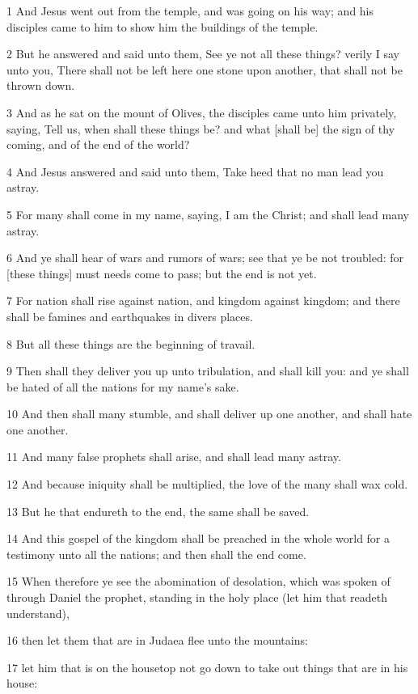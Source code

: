 \par 1 And Jesus went out from the temple, and was going on his way; and his disciples came to him to show him the buildings of the temple.
\par 2 But he answered and said unto them, See ye not all these things? verily I say unto you, There shall not be left here one stone upon another, that shall not be thrown down.
\par 3 And as he sat on the mount of Olives, the disciples came unto him privately, saying, Tell us, when shall these things be? and what [shall be] the sign of thy coming, and of the end of the world?
\par 4 And Jesus answered and said unto them, Take heed that no man lead you astray.
\par 5 For many shall come in my name, saying, I am the Christ; and shall lead many astray.
\par 6 And ye shall hear of wars and rumors of wars; see that ye be not troubled: for [these things] must needs come to pass; but the end is not yet.
\par 7 For nation shall rise against nation, and kingdom against kingdom; and there shall be famines and earthquakes in divers places.
\par 8 But all these things are the beginning of travail.
\par 9 Then shall they deliver you up unto tribulation, and shall kill you: and ye shall be hated of all the nations for my name's sake.
\par 10 And then shall many stumble, and shall deliver up one another, and shall hate one another.
\par 11 And many false prophets shall arise, and shall lead many astray.
\par 12 And because iniquity shall be multiplied, the love of the many shall wax cold.
\par 13 But he that endureth to the end, the same shall be saved.
\par 14 And this gospel of the kingdom shall be preached in the whole world for a testimony unto all the nations; and then shall the end come.
\par 15 When therefore ye see the abomination of desolation, which was spoken of through Daniel the prophet, standing in the holy place (let him that readeth understand),
\par 16 then let them that are in Judaea flee unto the mountains:
\par 17 let him that is on the housetop not go down to take out things that are in his house:
